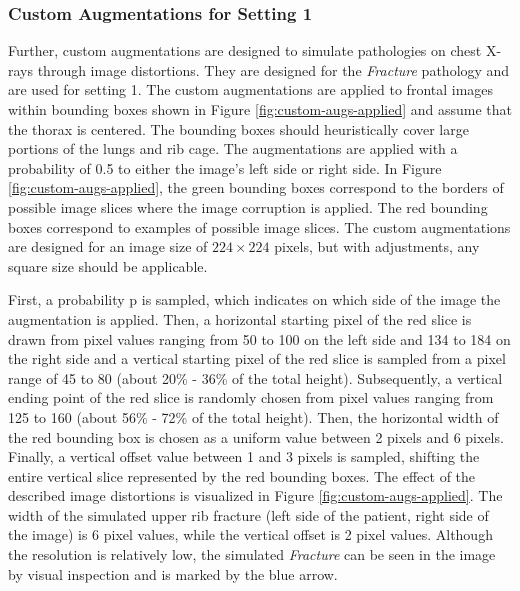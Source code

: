\subsubsection{Custom Augmentations for Setting 1}
Further, custom augmentations are designed to simulate pathologies on chest X-rays through image distortions.
They are designed for the \textit{Fracture} pathology and are used for setting 1.
The custom augmentations are applied to frontal images within bounding boxes shown in Figure \ref{fig:custom-augs-applied} and assume that the thorax is centered.
The bounding boxes should heuristically cover large portions of the lungs and rib cage.
The augmentations are applied with a probability of 0.5 to either the image's left side or right side.
In Figure \ref{fig:custom-augs-applied}, the green bounding boxes correspond to the borders of possible image slices where the image corruption is applied.
The red bounding boxes correspond to examples of possible image slices.
The custom augmentations are designed for an image size of $224\times224$ pixels, but with adjustments, any square size should be applicable.
\par
First, a probability p is sampled, which indicates on which side of the image the augmentation is applied.
Then, a horizontal starting pixel of the red slice is drawn from pixel values ranging from 50 to 100 on the left side and 134 to 184 on the right side and a vertical starting pixel of the red slice is sampled from a pixel range of 45 to 80 (about 20\% - 36\% of the total height).
Subsequently, a vertical ending point of the red slice is randomly chosen from pixel values ranging from 125 to 160 (about 56\% - 72\% of the total height).
Then, the horizontal width of the red bounding box is chosen as a uniform value between 2 pixels and 6 pixels.
Finally, a vertical offset value between 1 and 3 pixels is sampled, shifting the entire vertical slice represented by the red bounding boxes.
The effect of the described image distortions is visualized in Figure \ref{fig:custom-augs-applied}.
The width of the simulated upper rib fracture (left side of the patient, right side of the image) is 6 pixel values, while the vertical offset is 2 pixel values.
Although the resolution is relatively low, the simulated \textit{Fracture} can be seen in the image by visual inspection and is marked by the blue arrow.
